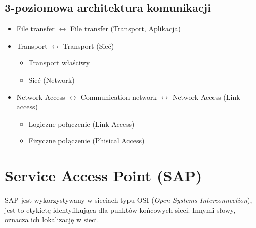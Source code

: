 \documentclass[a4paper,twoside]{article}
\begin{document}
	\subsection{3-poziomowa architektura komunikacji}
	\begin{itemize}
		\item File transfer $\longleftrightarrow$ File transfer (Transport, Aplikacja)
		\item Transport $\longleftrightarrow$ Transport (Sieć)
		\begin{itemize}
			\item Transport właściwy
			\item Sieć (Network)
		\end{itemize}
		\item Network Access $\longleftrightarrow$ Communication network
		 $\longleftrightarrow$ Network Access (Link access)
		 \begin{itemize}
		 	\item Logiczne połączenie (Link Access)
		 	\item Fizyczne połączenie (Phisical Access)
		 \end{itemize}
	\end{itemize}
\section{Service Access Point (SAP)}
SAP jest wykorzystywany w sieciach typu OSI (\emph{Open Systems Interconnection}), jest to etykietę identyfikująca dla punktów końcowych sieci. Innymi słowy, oznacza ich lokalizację w sieci.
\end{document}
